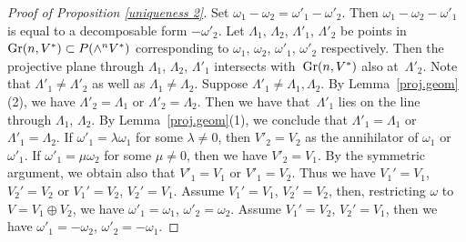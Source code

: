 \begin{proof}[Proof of Proposition \ref{uniqueness 2}]
Set $\omega_1 - \omega_2 = \omega'_1 - \omega'_2$. Then
$\omega_1 - \omega_2 - \omega'_1$ is equal to a decomposable form
$- \omega'_2$.
Let $\Lambda_1$, $\Lambda_2$, $\Lambda'_1$, $\Lambda'_2$ be
points in ${\rm Gr}(n, V^*) \subset P(\wedge^n V^*)$
corresponding to $\omega_1$, $\omega_2$, $\omega'_1$, $\omega'_2$ respectively.
Then the projective plane through $\Lambda_1$, $\Lambda_2$, $\Lambda'_1$
intersects with~${\rm Gr}(n, V^*)$ also at~$\Lambda'_2$.
Note that $\Lambda'_1 \not= \Lambda'_2$ as well as
$\Lambda_1 \not= \Lambda_2$.
Suppose $\Lambda'_1 \not= \Lambda_1, \Lambda_2$.
By Lemma~\ref{proj.geom}(2), we have
$\Lambda'_2 = \Lambda_1$ or $\Lambda'_2 = \Lambda_2$.
Then we have that~$\Lambda'_1$ lies on the line through $\Lambda_1$, $\Lambda_2$.
By Lemma~\ref{proj.geom}(1), we conclude that
$\Lambda'_1 = \Lambda_1$ or $\Lambda'_1 = \Lambda_2$.
If $\omega'_1 = \lambda\omega_1$ for some $\lambda \not= 0$,
then $V'_2 = V_2$ as the annihilator of $\omega_1$ or $\omega'_1$.
If $\omega'_1 = \mu\omega_2$ for some $\mu \not= 0$,
then we have $V'_2 = V_1$.
By the symmetric argument, we obtain also that $V'_1 = V_1$ or $V'_1 = V_2$.
Thus we have $V_1' = V_1$, $V_2' = V_2$ or
$V_1' = V_2$,  $V_2' = V_1$.
Assume $V_1' = V_1$, $V_2' = V_2$, then,
restricting $\omega$ to $V = V_1 \oplus V_2$, we have
$\omega'_1 = \omega_1$, $\omega'_2 = \omega_2$.
Assume $V_1' = V_2$,  $V_2' = V_1$,
then we have $\omega'_1 = -\omega_2$, $\omega'_2 = - \omega_1$.
\end{proof}
